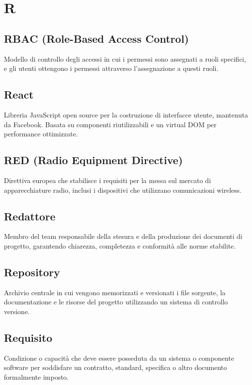 \documentclass[a4paper,11pt]{article}
\begin{document}
\newpage
\section{R}

\subsection{RBAC (Role-Based Access Control)}
Modello di controllo degli accessi in cui i permessi sono assegnati a ruoli specifici, e gli utenti ottengono i permessi attraverso l'assegnazione a questi ruoli.

\subsection{React}
Libreria JavaScript open source per la costruzione di interfacce utente, mantenuta da Facebook. Basata su componenti riutilizzabili e un virtual DOM per performance ottimizzate.

\subsection{RED (Radio Equipment Directive)}
Direttiva europea che stabilisce i requisiti per la messa sul mercato di apparecchiature radio, inclusi i dispositivi che utilizzano comunicazioni wireless.

\subsection{Redattore}
Membro del team responsabile della stesura e della produzione dei documenti di progetto, garantendo chiarezza, completezza e conformità alle norme stabilite.

\subsection{Repository}
Archivio centrale in cui vengono memorizzati e versionati i file sorgente, la documentazione e le risorse del progetto utilizzando un sistema di controllo versione.

\subsection{Requisito}
Condizione o capacità che deve essere posseduta da un sistema o componente software per soddisfare un contratto, standard, specifica o altro documento formalmente imposto.
\end{document}
